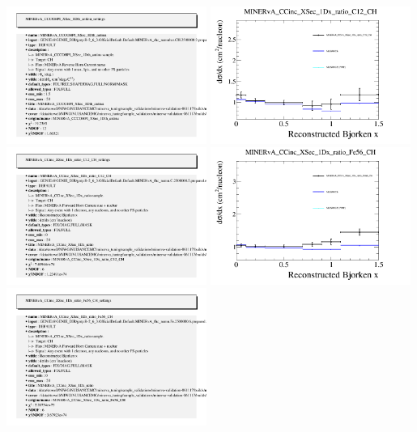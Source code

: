 \documentclass{article}
\begin{document}
\includegraphics[width=0.49\textwidth]{figures/nuisance_MINERvA_CCCOHPI_XSec_1Dth_antinu_info.png}
\centering
\includegraphics[width=0.49\textwidth]{figures/nuisance_MINERvA_CCinc_XSec_1Dx_ratio_C12_CH_comp.png}
\includegraphics[width=0.49\textwidth]{figures/nuisance_MINERvA_CCinc_XSec_1Dx_ratio_C12_CH_info.png}
\centering
\includegraphics[width=0.49\textwidth]{figures/nuisance_MINERvA_CCinc_XSec_1Dx_ratio_Fe56_CH_comp.png}
\includegraphics[width=0.49\textwidth]{figures/nuisance_MINERvA_CCinc_XSec_1Dx_ratio_Fe56_CH_info.png}
\end{document}
